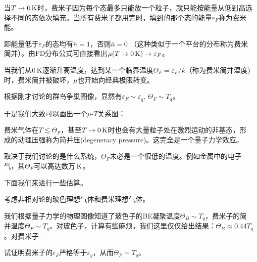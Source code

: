 \documentclass[CJK]{beamer}
\begin{document}
\begin{frame}
\bch
{}
{\small
当$T \rightarrow 0\,\mathrm{K}$时，费米子因为每个态最多只能放一个粒子，就只能按能量从低到高选择不同的态依次填充。当所有费米子都用完时，填到的那个态的能量$\varepsilon_F$称为{\blue 费米能}。

即能量低于$\varepsilon_F$的态均有$\bar{n} = 1$，否则$\bar{n} = 0$ （这种类似于一个平台的分布称为费米简并）。由FD分布公式可直接看出$\mu(T\rightarrow 0\,\mathrm{K}) \rightarrow \varepsilon_F$。


当我们从$0\,\mathrm{K}$逐渐升高温度，达到某一个临界温度$\Theta_F = \varepsilon_F/k $（称为{\blue 费米简并温度})时，费米简并被破坏，$\mu$也开始向经典极限转变。

根据刚才讨论的群鸟争巢图像，显然有$\varepsilon_F \sim \varepsilon_q$,  $\Theta_F \sim T_q$。

于是我们大致可以画出一个$\mu$-$T$关系图：}
\emini
{}
\emini

\ech
\end{frame}


\begin{frame}
\bch


费米气体在$T\lesssim \Theta_F$，甚至$T\rightarrow 0\,\mathrm{K}$时也会有大量粒子处在激烈运动的非基态，形成的动理压强称为{\blue 简并压}(degeneracy pressure)。这完全是一个量子力学效应。

\skipline

取决于我们讨论的是什么系统，$\Theta_F$未必是一个很低的温度。例如金属中的电子气，其$\Theta_F$可以高达数万$\,\mathrm{K}$。

下面我们来进行一些估算。
\ech
\end{frame}



\begin{frame}
\bch
{\small

考虑非相对论的玻色理想气体和费米理想气体。

\skipline

我们根据量子力学的物理图像知道了玻色子的BE凝聚温度$\Theta_B \sim T_q$，费米子的简并温度$\Theta_F\sim T_q$。对玻色子，计算有些麻烦，我们这里仅仅给出结果：$\Theta_B \approx 0.44 T_q$。对费米子——


试证明费米子的$\varepsilon_F$严格等于$\varepsilon_q$，从而$\Theta_F = T_q$。

}
\ech
\end{frame}
\end{document}
